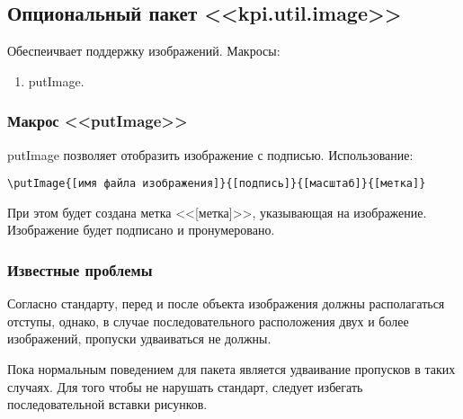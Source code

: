 \subsection{Опциональный пакет <<kpi.util.image>>}
Обеспеичвает поддержку изображений.
Макросы:
\begin{enumerate}
\item putImage.
\end{enumerate}
\subsubsection{Макрос <<putImage>>}
putImage позволяет отобразить изображение с подписью.
Использование:{\small
\begin{Verbatim}
\putImage{[имя файла изображения]}{[подпись]}{[масштаб]}{[метка]}
\end{Verbatim}}
\normalsize
При этом будет создана метка <<[метка]>>, указывающая на изображение. Изображение будет подписано и пронумеровано.

\subsubsection{Известные проблемы}
Согласно стандарту, перед и после объекта изображения должны располагаться отступы, однако, в случае последовательного расположения двух и более изображений, пропуски удваиваться не должны.\par
Пока нормальным поведением для пакета является удваивание пропусков в таких случаях. Для того чтобы не нарушать стандарт, следует избегать последовательной вставки рисунков.